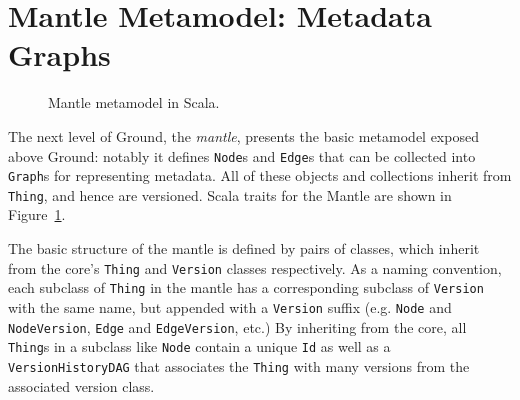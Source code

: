 \documentclass{article}
\newcommand{\core}{core\xspace}
\newcommand{\mantle}{mantle\xspace}
\newcommand{\Mantle}{Mantle\xspace}
\newcommand{\version}{\texttt{Version}\xspace}
\newcommand{\thing}{\texttt{Thing}\xspace}
\newcommand{\node}{\texttt{Node}\xspace}
\newcommand{\edge}{\texttt{Edge}\xspace}
\newcommand{\graph}{\texttt{Graph}\xspace}
\newcommand{\jmh}[1]{{\textcolor{red}{#1---jmh}}}
\newcommand{\vikram}[1]{{\textcolor{blue}{#1---vikram}}}
\begin{document}
\section{\Mantle Metamodel: Metadata Graphs}

\begin{figure}[ht]
\begin{scriptsize}
\begin{multicols}{2}

\end{multicols}
\end{scriptsize}
\caption{\Mantle metamodel in Scala.}
\label{fig:mantle}
\end{figure}



The next level of Ground, the \emph{\mantle}, presents the basic metamodel exposed above Ground: notably it defines {\node}s and {\edge}s that can be collected into {\graph}s for representing metadata.  All of these objects and collections inherit from \thing, and hence are versioned.   Scala traits for the Mantle are shown in Figure~\ref{fig:mantle}.

The basic structure of the \mantle is defined by pairs of classes,
which inherit from the \core's \thing and \version classes respectively.   As a
naming convention, each subclass of \thing in the mantle has a corresponding
subclass of \version with the same name, but appended with a \texttt{Version}
suffix (e.g. \node and \texttt{NodeVersion}, \edge and \texttt{EdgeVersion},
etc.)  By inheriting from the core, all {\thing}s in a
subclass like \node contain a unique \texttt{Id} as well as a
\texttt{VersionHistoryDAG} that associates the \thing with many versions from
the associated version class.  
\end{document}
